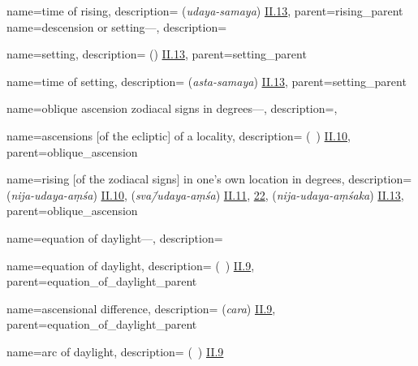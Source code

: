 {
        name={time of rising},
        description={ (\textit{udaya-samaya}) \hyperlink{Sii13}{II.13}},
        parent={rising_parent}
}
{
        name={descension or setting---},
        description={\phantom{x}\nopagebreak}
}

{
        name={setting},
        description={ (\ghurub) \hyperlink{Pii13}{II.13}},
        parent={setting_parent}
}

{
        name={time of setting},
        description={ (\textit{asta-samaya}) \hyperlink{Sii13}{II.13}},
        parent={setting_parent}
}

{
        name={oblique ascension zodiacal signs in degrees---},
        description={\phantom{x}\nopagebreak},
}

{
        name={ascensions [of the ecliptic] of a locality},
        description={ (\matali\idafaconsonant\ \balad) \hyperlink{Pii10}{II.10}},
        parent={oblique_ascension}
}

{
        name={rising [of the zodiacal signs] in one's own location in degrees},
        description={ (\textit{nija-udaya-aṃśa}) \hyperlink{Sii10}{II.10},  (\textit{sva\=/udaya-aṃśa}) \hyperlink{Sii11}{II.11}, \hyperlink{Sii22}{22},  (\textit{nija-udaya-aṃśaka}) \hyperlink{Sii13}{II.13}},
        parent={oblique_ascension}
}


{
        name={equation of daylight---},
        description={\phantom{x}\nopagebreak}
}

{
        name={equation of daylight},
        description={ (\tadil\ \alnahar) \hyperlink{Pii9}{II.9}},
        parent={equation_of_daylight_parent}
}

{
        name={ascensional difference},
        description={ (\textit{cara}) \hyperlink{Sii9}{II.9}},
        parent={equation_of_daylight_parent}
}
        
{
        name={arc of daylight},
        description={ (\qaws\ \alnahar) \hyperlink{Pii9}{II.9}}
}

